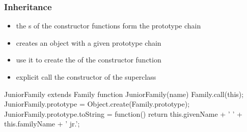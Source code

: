 \begin{frame}[fragile] \frametitle{Inheritance}
\begin{itemize}
  \item the s of the constructor functions form the prototype chain
  \item {} creates an object with a given prototype chain
  \item use it to create the  of the constructor function
  \item explicit call the constructor of the superclass
\end{itemize}
\vspace{2mm}
\begin{CodeBox}{JuniorFamily extends Family}
function JuniorFamily(name) {
  Family.call(this);
}
JuniorFamily.prototype = Object.create(Family.prototype);
JuniorFamily.prototype.toString = function() {
  return this.givenName + ' ' + 
             this.familyName + '  jr.';
}
\end{CodeBox}
\end{frame}

